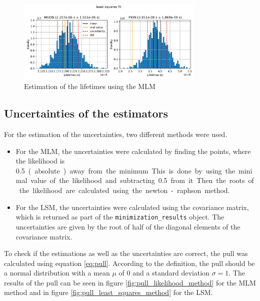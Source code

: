 \documentclass[11pt, a4paper, oneside]{book}
\newcommand\Plotwidth{0.8}
\begin{document}
\begin{figure}[H]
  \centering
  \includegraphics[width=\Plotwidth\textwidth]{images/estimators_hist_least_squares.pdf}
  \caption{Estimation of the lifetimes using the MLM}
  \label{fig:least_squares_results}
\end{figure}


\subsection{Uncertainties of the estimators}
For the estimation of the uncertainties, two different methods were used. 
\begin{itemize}
    \item For the MLM, the uncertainties were calculated by finding the points, where the likelihood is \qty{0.5} (absolute) away from the minimum. This is done by using the minimal value of the likelihood and subtracting \qty{0.5} from it. Then the roots of the likelihood are calculated using the newton-raphson method. 
    \item For the LSM, the uncertainties were calculated using the covariance matrix, which is returned as part of the \lstinline{minimization_results} object. The uncertainties are given by the root of half of the diagonal elements of the covariance matrix.
\end{itemize}

To check if the estimations as well as the uncertainties are correct, the pull was calculated using equation \ref{eq:pull}. According to the definition, the pull should be a normal distribution with a mean $\mu$ of 0 and a standard deviation $\sigma = 1$. The results of the pull can be seen in figure \ref{fig:pull_likelihood_method} for the MLM method and in figure \ref{fig:pull_least_squares_method} for the LSM. 
\end{document}
